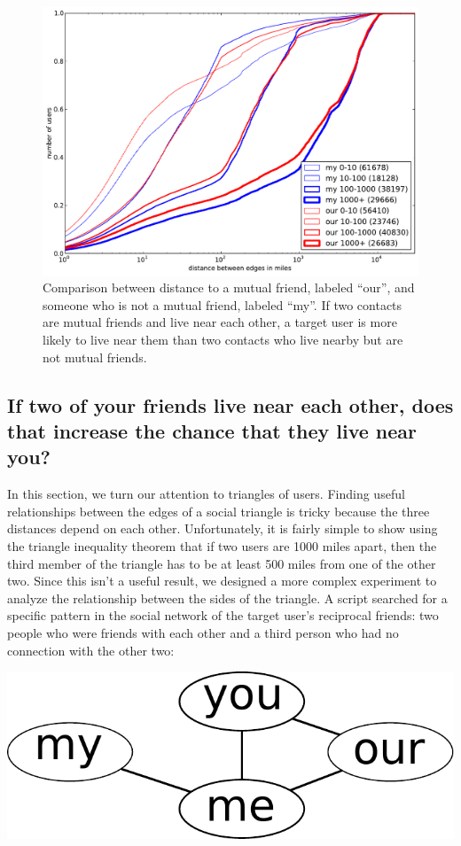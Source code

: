 \documentclass[letterpaper]{article}
\newcommand{\flsec}[1]{\subsection{#1}}
\begin{document}
\begin{figure}[tbh]
\centering
\includegraphics[width=\linewidth]{figures/near_triads.pdf}
\caption{
Comparison between distance to a mutual friend, labeled ``our'', and someone
who is not a mutual friend, labeled ``my''.
If two contacts are mutual friends and live near each other, a target user is
more likely to live near them than two contacts who live nearby but are not
mutual friends.
}
\label{fig:NearTriads}
\end{figure}

\flsec{If two of your friends live near each other, does that increase the
chance that they live near you?}

In this section, we turn our attention to triangles of users.
Finding useful relationships between the edges of a social triangle is tricky
because the three distances depend on each other.
Unfortunately, it is fairly simple to show using the triangle inequality theorem
that if two users are 1000 miles apart, then the third member of the triangle
has to be at least 500 miles from one of the other two.
Since this isn't a useful result, we designed a more complex experiment to
analyze the relationship between the sides of the triangle.
A script searched for a specific pattern in the social network of
the target user's reciprocal friends: two people who were friends with each
other and a third person who had no connection with the other two:

\begin{center}
\includegraphics[width=0.3\linewidth]{figures/near_triads_dia.pdf}
\end{center}
\end{document}
